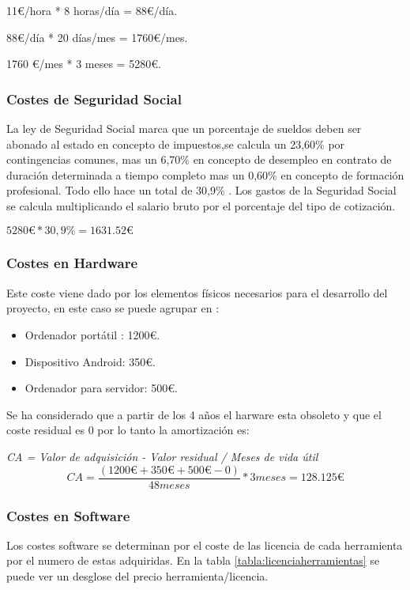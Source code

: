 \begin{center}
11\euro/hora * 8 horas/día = 88\euro/día.

88\euro/día * 20 días/mes = 1760\euro/mes.

1760 \euro/mes * 3 meses = 5280\euro.
\end{center}

\subsubsection{Costes de Seguridad Social}
La ley de Seguridad Social marca que un porcentaje de sueldos deben ser abonado al estado en concepto de impuestos,se calcula un 23,60\% por contingencias comunes, mas un 6,70\% en concepto de desempleo en contrato de duración determinada a tiempo completo mas un 0,60\% en concepto de formación profesional. Todo ello hace un total de 30,9\% \cite{seguridad} .
Los gastos de la Seguridad Social se calcula multiplicando el salario bruto por el porcentaje del tipo de cotización.

\begin{center}
$5280 \euro * 30,9\% = 1631.52\euro$
\end{center}

\subsubsection{Costes en Hardware}
Este coste viene dado por los elementos físicos necesarios para el desarrollo del proyecto, en este caso se puede agrupar en :

\begin{itemize}
	\item Ordenador portátil : 1200\euro.
	\item Dispositivo Android: 350\euro.
	\item Ordenador para servidor: 500\euro.
\end{itemize}
Se ha considerado que a partir de los 4 años el harware esta obsoleto y que el coste residual es 0 por lo tanto la amortización es:

\textit{CA = Valor de adquisición - Valor residual / Meses de vida útil}
	\begin{equation}
	CA= \frac{\left (  1200\euro+350\euro+500\euro - 0\right )}{48 meses}*3 meses=128.125\euro
	\end{equation}

\subsubsection{Costes en Software}
Los costes software se determinan por el coste de las licencia de cada herramienta por el numero de estas adquiridas. En la tabla \ref{tabla:licenciaherramientas} se puede ver un desglose del precio herramienta/licencia.

